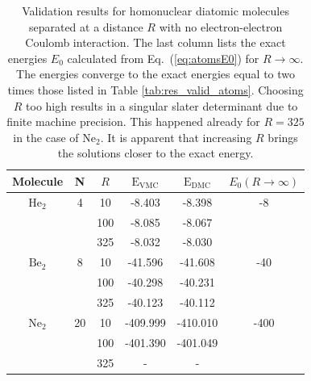 \setlength{\tabcolsep}{0.6cm}
\begin{table}
\begin{center}
\begin{tabular}{cc|cccc}
 Molecule &   N     & $R$ & $\mathrm{E_{VMC}}$ & $\mathrm{E_{DMC}}$ & $E_0(R\to\infty)$\\
\hline
 $\mathrm{He}_2$  & 4     & 10  &   -8.403     &  -8.398    & -8  \\
   &       & 100 &   -8.085     &  -8.067    &     \\
   &       & 325 &   -8.032     &  -8.030    &     \\
 $\mathrm{Be}_2$  & 8     & 10  &  -41.596     &  -41.608   & -40 \\
  &        & 100 &  -40.298     &  -40.231   &     \\
   &       & 325 &  -40.123     &  -40.112   &     \\
 $\mathrm{Ne}_2$ &  20    & 10  &  -409.999    &  -410.010  & -400\\
  &        & 100 &  -401.390    &  -401.049  &     \\
  &        & 325 &  -           &  -         &     \\
\end{tabular}
\caption{Validation results for homonuclear diatomic molecules separated at a distance $R$ with no electron-electron Coulomb interaction. The last column lists the exact energies $E_0$ calculated from Eq.~(\ref{eq:atomsE0}) for $R\to\infty$. The energies converge to the exact energies equal to two times those listed in Table \ref{tab:res_valid_atoms}. Choosing $R$ too high results in a singular slater determinant due to finite machine precision. This happened already for $R=325$ in the case of  $\mathrm{Ne}_2$. It is apparent that increasing $R$ brings the solutions closer to the exact energy.}
\label{tab:res_valid_molecules}
\end{center}
\end{table}
\setlength{\tabcolsep}{6pt}


